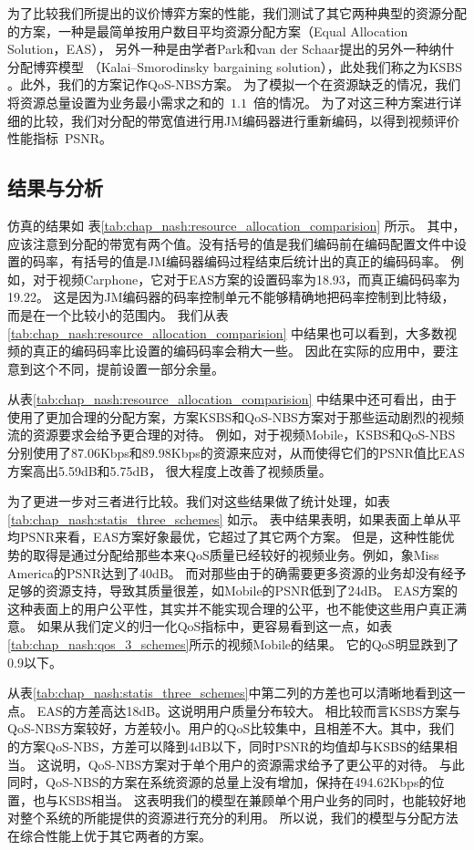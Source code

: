 为了比较我们所提出的议价博弈方案的性能，我们测试了其它两种典型的资源分配的方案，一种是最简单按用户数目平均资源分配方案（Equal Allocation Solution，EAS），
另外一种是由学者Park和van der Schaar提出的另外一种纳什分配博弈模型 （Kalai–Smorodinsky  bargaining  solution），此处我们称之为KSBS \cite{ParkVanderSchaar2007}。此外，我们的方案记作QoS-NBS方案。
为了模拟一个在资源缺乏的情况，我们将资源总量设置为业务最小需求之和的~$1.1$~倍的情况。
为了对这三种方案进行详细的比较，我们对分配的带宽值进行用JM编码器进行重新编码，以得到视频评价性能指标~PSNR。

\subsection{结果与分析}
仿真的结果如 表\ref{tab:chap_nash:resource_allocation_comparision} 所示。
其中，应该注意到分配的带宽有两个值。没有括号的值是我们编码前在编码配置文件中设置的码率，有括号的值是JM编码器编码过程结束后统计出的真正的编码码率。
例如，对于视频Carphone，它对于EAS方案的设置码率为18.93，而真正编码码率为19.22。
这是因为JM编码器的码率控制单元不能够精确地把码率控制到比特级，而是在一个比较小的范围内。
我们从表\ref{tab:chap_nash:resource_allocation_comparision} 中结果也可以看到，大多数视频的真正的编码码率比设置的编码码率会稍大一些。
因此在实际的应用中，要注意到这个不同，提前设置一部分余量。

从表\ref{tab:chap_nash:resource_allocation_comparision} 中结果中还可看出，由于使用了更加合理的分配方案，方案KSBS和QoS-NBS方案对于那些运动剧烈的视频流的资源要求会给予更合理的对待。
例如，对于视频Mobile，KSBS和QoS-NBS分别使用了87.06Kbps和89.98Kbps的资源来应对，从而使得它们的PSNR值比EAS方案高出5.59dB和5.75dB，
很大程度上改善了视频质量。

为了更进一步对三者进行比较。我们对这些结果做了统计处理，如表\ref{tab:chap_nash:statis_three_schemes} 如示。
表中结果表明，如果表面上单从平均PSNR来看，EAS方案好象最优，它超过了其它两个方案。
但是，这种性能优势的取得是通过分配给那些本来QoS质量已经较好的视频业务。例如，象Miss America的PSNR达到了40dB。
而对那些由于的确需要更多资源的业务却没有经予足够的资源支持，导致其质量很差，如Mobile的PSNR低到了24dB。
EAS方案的这种表面上的用户公平性，其实并不能实现合理的公平，也不能使这些用户真正满意。
如果从我们定义的归一化QoS指标中，更容易看到这一点，如表\ref{tab:chap_nash:qos_3_schemes}所示的视频Mobile的结果。
它的QoS明显跌到了0.9以下。


从表\ref{tab:chap_nash:statis_three_schemes}中第二列的方差也可以清晰地看到这一点。
EAS的方差高达18dB。这说明用户质量分布较大。
相比较而言KSBS方案与QoS-NBS方案较好，方差较小。用户的QoS比较集中，且相差不大。其中，我们的方案QoS-NBS，方差可以降到4dB以下，同时PSNR的均值却与KSBS的结果相当。
这说明，QoS-NBS方案对于单个用户的资源需求给予了更公平的对待。
与此同时，QoS-NBS的方案在系统资源的总量上没有增加，保持在494.62Kbps的位置，也与KSBS相当。
这表明我们的模型在兼顾单个用户业务的同时，也能较好地对整个系统的所能提供的资源进行充分的利用。
所以说，我们的模型与分配方法在综合性能上优于其它两者的方案。

